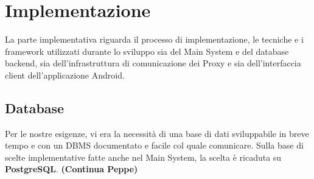 \chapter{Implementazione}
La parte implementativa riguarda il processo di implementazione, le tecniche e i framework utilizzati durante lo sviluppo sia del Main System e del database backend, sia dell'infrastruttura di comunicazione dei Proxy e sia dell'interfaccia client dell'applicazione Android. 

\section{Database}
Per le nostre esigenze, vi era la necessità di una base di dati sviluppabile in breve tempo e con un DBMS documentato e facile col quale comunicare. Sulla base di scelte implementative fatte anche nel Main System, la scelta è ricaduta su \textbf{PostgreSQL}. \textbf{(Continua Peppe)}

